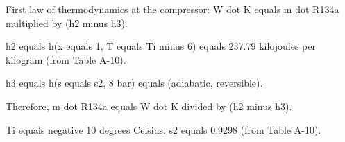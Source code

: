 First law of thermodynamics at the compressor:  
W dot K equals m dot R134a multiplied by (h2 minus h3).  

h2 equals h(x equals 1, T equals Ti minus 6) equals 237.79 kilojoules per kilogram (from Table A-10).  

h3 equals h(s equals s2, 8 bar) equals (adiabatic, reversible).  

Therefore, m dot R134a equals W dot K divided by (h2 minus h3).  

Ti equals negative 10 degrees Celsius.  
s2 equals 0.9298 (from Table A-10).